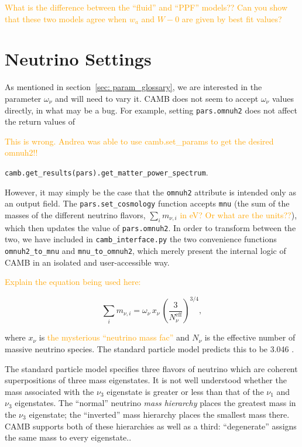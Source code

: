 \textcolor{orange}{What is the difference between the ``fluid'' and ``PPF''
models?? Can you show that these two models agree when $w_a$ and $W-0$ are
given by best fit values?}

\section{Neutrino Settings}
\label{sec: neutrino_settings}


As mentioned in section~\ref{sec: param_glossary}, we are interested in the
parameter $\omega_\nu$ and will need to vary it. CAMB does not seem to accept
$\omega_\nu$ values directly, in what may be a bug. For example, setting
\verb|pars.omnuh2| does not affect the return values of

\textcolor{orange}{This is wrong. Andrea was able to use camb.set\_params to 
get the desired omnuh2!!}

\verb|camb.get_results(pars).get_matter_power_spectrum|.

However, it may simply be the case that the \verb|omnuh2| attribute is
intended only as an output field. The \verb|pars.set_cosmology| function
accepts \verb|mnu| (the sum of the masses of the different neutrino flavors,
$\sum_i m_{\nu, i}$ \textcolor{orange}{in eV? Or what are the units??}),
which then updates the value of \verb|pars.omnuh2|.
In order to transform between the two, we have included in
\verb|camb_interface.py| the two convenience functions
\verb|omnuh2_to_mnu| and \verb|mnu_to_omnuh2|, which merely present the 
internal logic of CAMB in an isolated and user-accessible way.

\textcolor{orange}{Explain the equation being used here:}

\begin{equation}
\sum_i m_{\nu, i}
=
\omega_\nu \, x_\nu \, \left( \frac{3}{N_\nu^\text{eff}} \right)^{3/4}
,\end{equation}

where $x_\nu$ is \textcolor{orange}{the mysterious ``neutrino mass fac''} and
$N_\nu$ is the effective number of massive neutrino species. The standard
particle model predicts this to be 3.046 .

The standard particle model specifies three flavors of neutrino which are
coherent superpositions of three mass eigenstates. It is not well understood
whether the mass associated with the $\nu_3$ eigenstate is greater or less
than that of the $\nu_1$ and $\nu_3$ eigenstates. The ``normal'' neutrino
\textit{mass hierarchy} places the greatest mass in the $\nu_3$
eigenstate; the ``inverted'' mass hierarchy places the smallest mass there. 
CAMB supports both of these hierarchies as well as a third: ``degenerate''
assigns the same mass to every eigenstate..

